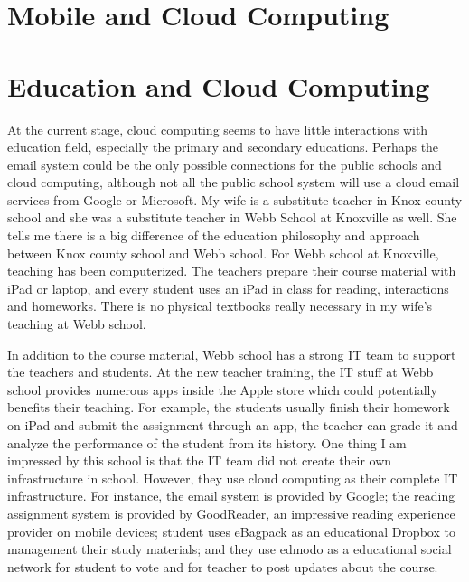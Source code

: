 \section{Mobile and Cloud Computing}

\section{Education and Cloud Computing}
At the current stage, cloud computing seems to have little interactions with education field, especially the primary and secondary educations. Perhaps the email system could be the only possible connections for the public schools and cloud computing, although not all the public school system will use a cloud email services from Google or Microsoft. My wife is a substitute teacher in Knox county school and she was a substitute teacher in Webb School at Knoxville as well. She tells me there is a big difference of the education philosophy and approach between Knox county school and Webb school. For Webb school at Knoxville, teaching has been computerized. The teachers prepare their course material with iPad or laptop, and every student uses an iPad in class for reading, interactions and homeworks. There is no physical textbooks really necessary in my wife's teaching at Webb school.

In addition to the course material, Webb school has a strong IT team to support the teachers and students. At the new teacher training, the IT stuff at Webb school provides numerous apps inside the Apple store which could potentially benefits their teaching. For example, the students usually finish their homework on iPad and submit the assignment through an app, the teacher can grade it and analyze the performance of the student from its history. One thing I am impressed by this school is that the IT team did not create their own infrastructure in school. However, they use cloud computing as their complete IT infrastructure. For instance, the email system is provided by Google; the reading assignment system is provided by GoodReader, an impressive reading experience provider on mobile devices; student uses eBagpack as an educational Dropbox to management their study materials; and they use edmodo as a educational social network for student to vote and for teacher to post updates about the course. 

